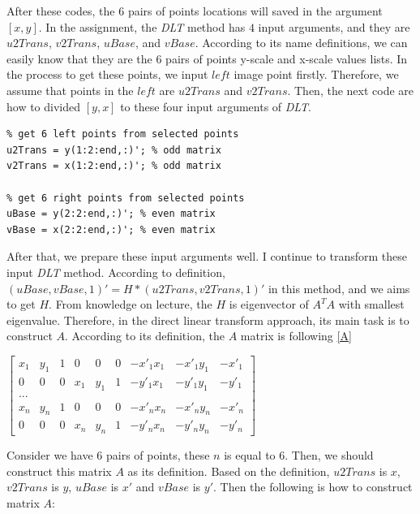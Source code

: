 \documentclass[12pt]{article}
\begin{document}
After these codes, the $6$ pairs of points locations will saved in the argument $[x, y]$. In the assignment, the \textit{DLT} method has $4$ input arguments, and they are $u2Trans$, $v2Trans$, $uBase$, and $vBase$. According to its name definitions, we can easily know that they are the $6$ pairs of points y-scale and x-scale values lists. In the process to get these points, we input $left$ image point firstly. Therefore, we assume that points in the $left$ are $u2Trans$ and $v2Trans$. Then, the next code are how to divided $[y, x]$ to these four input arguments of \textit{DLT}.

\begin{lstlisting}
% get 6 left points from selected points
u2Trans = y(1:2:end,:)'; % odd matrix
v2Trans = x(1:2:end,:)'; % odd matrix

% get 6 right points from selected points
uBase = y(2:2:end,:)'; % even matrix
vBase = x(2:2:end,:)'; % even matrix
\end{lstlisting}

After that, we prepare these input arguments well. I continue to transform these input \textit{DLT} method. According to definition, $(uBase, vBase, 1)'=H*(u2Trans , v2Trans, 1)' $ in this method, and we aims to get $H$. From knowledge on lecture, the $H$ is eigenvector of $A^{T}A$ with smallest eigenvalue. Therefore, in the direct linear transform approach, its main task is to construct $A$. According to its definition, the $A$ matrix is following \ref{A}

\label{A}
$\begin{bmatrix}
x_{1} & y_{1} & 1 & 0 & 0 & 0 & -x'_{1}x_{1} & -x'_{1}y_{1} & -x'_{1}\\ 
0 & 0 & 0 & x_{1} & y_{1} & 1 & -y'_{1}x_{1} & -y'_{1}y_{1} & -y'_{1}\\ 
... \\
x_{n} & y_{n} & 1 & 0 & 0 & 0 & -x'_{n}x_{n} & -x'_{n}y_{n} & -x'_{n}\\ 
0 & 0 & 0 & x_{n} & y_{n} & 1 & -y'_{n}x_{n} & -y'_{n}y_{n} & -y'_{n}
\end{bmatrix}
$

Consider we have $6$ pairs of points, these $n$ is equal to $6$. Then, we should construct this matrix $A$ as its definition. Based on the definition, $u2Trans$ is $x$, $v2Trans$ is $y$, $uBase$ is $x'$ and $vBase$ is $y'$. Then the following is how to construct matrix $A$:
\end{document}
